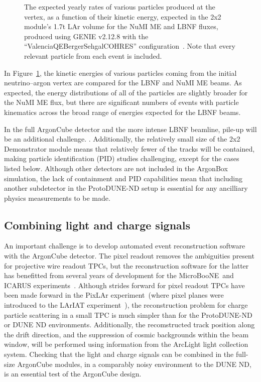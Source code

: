 \begin{figure}[htb]
  \caption{The expected yearly rates of various particles produced at the vertex, as a function of their kinetic energy, expected in the 2x2 module's 1.7t LAr volume for the NuMI ME and LBNF fluxes, produced using GENIE v2.12.8 with the ``ValenciaQEBergerSehgalCOHRES'' configuration~\cite{genie}. Note that every relevant particle from each event is included. }
  \label{fig:kinetic_energies}
\end{figure}
In Figure~\ref{fig:kinetic_energies}, the kinetic energies of various particles coming from the initial neutrino--argon vertex are compared for the LBNF and NuMI ME beams. As expected, the energy distributions of all of the particles are slightly broader for the NuMI ME flux, but there are significant numbers of events with particle kinematics across the broad range of energies expected for the LBNF beams.

In the full ArgonCube detector and the more intense LBNF beamline, pile-up will be an additional challenge. . Additionally, the relatively small size of the 2x2 Demonstrator module means that relatively fewer of the tracks will be contained, making particle identification (PID) studies challenging, except for the cases listed below. Although other detectors are not included in the ArgonBox simulation, the lack of containment and PID capabilities mean that including another subdetector in the ProtoDUNE-ND setup is essential for any ancilliary physics measurements to be made.

\FloatBarrier
\subsection{Combining light and charge signals}
An important challenge is to develop automated event reconstruction software with the ArgonCube detector. The pixel readout removes the ambiguities present for projective wire readout TPCs, but the reconstruction software for the latter has benefitted from several years of development for the MicroBooNE~\addcite and ICARUS experiments~\addcite. Although strides forward for pixel readout TPCs have been made forward in the PixLAr experiment~\addcite (where pixel planes were introduced to the LArIAT experiment~\addcite), the reconstruction problem for charge particle scattering in a small TPC is much simpler than for the ProtoDUNE-ND or DUNE ND environments. Additionally, the recomstructed track position along the drift direction, and the suppression of cosmic backgrounds within the beam window, will be performed using information from the ArcLight light collection system. Checking that the light and charge signals can be combined in the full-size ArgonCube modules, in a comparably noisy environment to the DUNE ND, is an essential test of the ArgonCube design.

